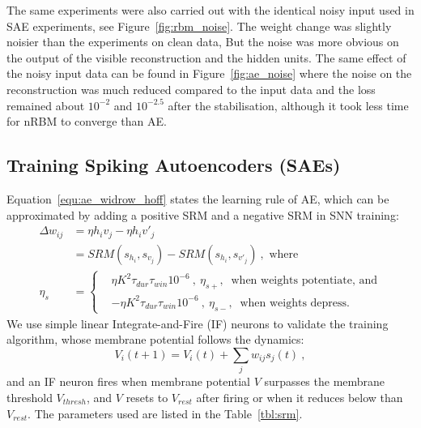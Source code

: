 The same experiments were also carried out with the identical noisy input used in SAE experiments, see Figure~\ref{fig:rbm_noise}.
The weight change was slightly noisier than the experiments on clean data, But the noise was more obvious on the output of the visible reconstruction and the hidden units.
The same effect of the noisy input data can be found in Figure~\ref{fig:ae_noise} where the noise on the reconstruction was much reduced compared to the input data and the loss remained about $10^{-2}$ and $10^{-2.5}$ after the stabilisation, although it took less time for nRBM to converge than AE.


\subsection{Training Spiking Autoencoders (SAEs)}
\label{subsec:SAE}
Equation~\ref{equ:ae_widrow_hoff} states the learning rule of AE, which can be approximated by adding a positive SRM and a negative SRM in SNN training:
\begin{equation}
\label{equ:sae}
\begin{aligned}
\Delta w_{ij} &= \eta h_i v_j - \eta h_i v'_j \\
&= SRM(s_{h_i}, s_{v_j}) - SRM(s_{h_i}, s_{v'_j})~, \textrm{~where}\\
\eta_{s}&=\left \{
\begin{aligned}
 &\eta K^2 \tau_{dur} \tau_{win}10^{-6}~, ~\eta_{s+},~\textrm{~when weights potentiate,~and}\\
 & -\eta K^2 \tau_{dur} \tau_{win}10^{-6}~, ~\eta_{s-},~\textrm{~when weights depress.}
 \end{aligned} 
 \right.
\end{aligned} 
\end{equation}
We use simple linear Integrate-and-Fire (IF) neurons to validate the training algorithm, whose membrane potential follows the dynamics:
\begin{equation}
V_i(t+1)=V_i(t) + \sum_j w_{ij} s_j(t)~,
\end{equation}
and an IF neuron fires when membrane potential $V$ surpasses the membrane threshold $V_{thresh}$, and $V$ resets to $V_{rest}$ after firing or when it reduces below than $V_{rest}$.
The parameters used are listed in the Table~\ref{tbl:srm}.
